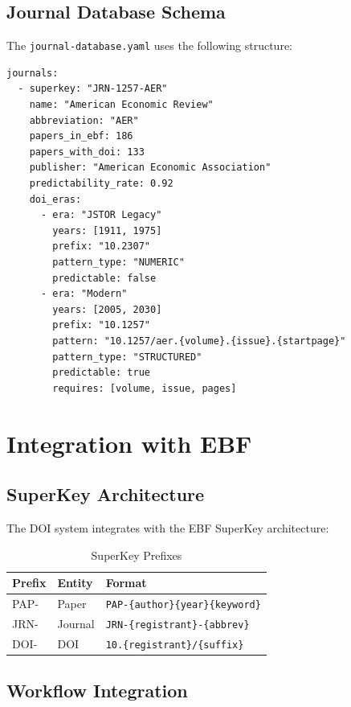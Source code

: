 \subsection{Journal Database Schema}

The \texttt{journal-database.yaml} uses the following structure:

\begin{verbatim}
journals:
  - superkey: "JRN-1257-AER"
    name: "American Economic Review"
    abbreviation: "AER"
    papers_in_ebf: 186
    papers_with_doi: 133
    publisher: "American Economic Association"
    predictability_rate: 0.92
    doi_eras:
      - era: "JSTOR Legacy"
        years: [1911, 1975]
        prefix: "10.2307"
        pattern_type: "NUMERIC"
        predictable: false
      - era: "Modern"
        years: [2005, 2030]
        prefix: "10.1257"
        pattern: "10.1257/aer.{volume}.{issue}.{startpage}"
        pattern_type: "STRUCTURED"
        predictable: true
        requires: [volume, issue, pages]
\end{verbatim}

\section{Integration with EBF}
\label{sec:integration}

\subsection{SuperKey Architecture}

The DOI system integrates with the EBF SuperKey architecture:

\begin{table}[h]
\centering
\caption{SuperKey Prefixes}
\begin{tabular}{lll}
\toprule
\textbf{Prefix} & \textbf{Entity} & \textbf{Format} \\
\midrule
PAP- & Paper & \texttt{PAP-\{author\}\{year\}\{keyword\}} \\
JRN- & Journal & \texttt{JRN-\{registrant\}-\{abbrev\}} \\
DOI- & DOI & \texttt{10.\{registrant\}/\{suffix\}} \\
\bottomrule
\end{tabular}
\end{table}

\subsection{Workflow Integration}

